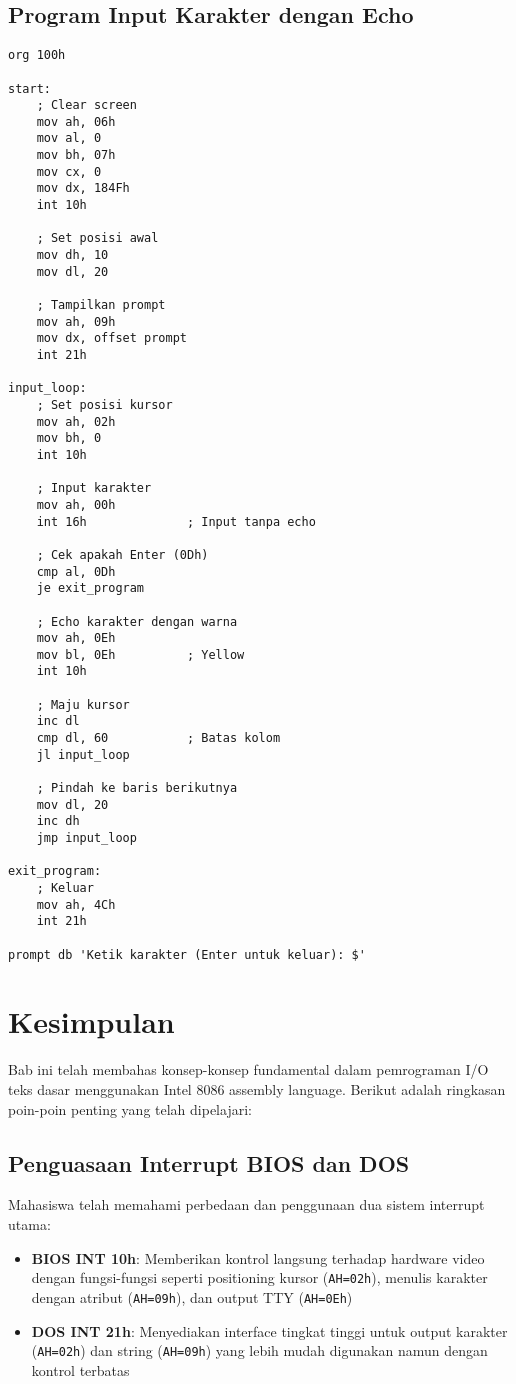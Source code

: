 \documentclass[../main.tex]{subfiles}
\begin{document}
        \subsection{Program Input Karakter dengan Echo}
            \begin{lstlisting}[language={[x86masm]Assembler}, caption=Program Input Karakter dengan Echo, label={lst:input-echo}]
org 100h

start:
    ; Clear screen
    mov ah, 06h
    mov al, 0
    mov bh, 07h
    mov cx, 0
    mov dx, 184Fh
    int 10h
    
    ; Set posisi awal
    mov dh, 10
    mov dl, 20
    
    ; Tampilkan prompt
    mov ah, 09h
    mov dx, offset prompt
    int 21h
    
input_loop:
    ; Set posisi kursor
    mov ah, 02h
    mov bh, 0
    int 10h
    
    ; Input karakter
    mov ah, 00h
    int 16h              ; Input tanpa echo
    
    ; Cek apakah Enter (0Dh)
    cmp al, 0Dh
    je exit_program
    
    ; Echo karakter dengan warna
    mov ah, 0Eh
    mov bl, 0Eh          ; Yellow
    int 10h
    
    ; Maju kursor
    inc dl
    cmp dl, 60           ; Batas kolom
    jl input_loop
    
    ; Pindah ke baris berikutnya
    mov dl, 20
    inc dh
    jmp input_loop
    
exit_program:
    ; Keluar
    mov ah, 4Ch
    int 21h

prompt db 'Ketik karakter (Enter untuk keluar): $'
            \end{lstlisting}

    \section{Kesimpulan}
        Bab ini telah membahas konsep-konsep fundamental dalam pemrograman I/O teks dasar menggunakan Intel 8086 assembly language. Berikut adalah ringkasan poin-poin penting yang telah dipelajari:

        \subsection{Penguasaan Interrupt BIOS dan DOS}
            Mahasiswa telah memahami perbedaan dan penggunaan dua sistem interrupt utama:
            \begin{itemize}
                \item \textbf{BIOS INT 10h}: Memberikan kontrol langsung terhadap hardware video dengan fungsi-fungsi seperti positioning kursor (\texttt{AH=02h}), menulis karakter dengan atribut (\texttt{AH=09h}), dan output TTY (\texttt{AH=0Eh})
                \item \textbf{DOS INT 21h}: Menyediakan interface tingkat tinggi untuk output karakter (\texttt{AH=02h}) dan string (\texttt{AH=09h}) yang lebih mudah digunakan namun dengan kontrol terbatas
            \end{itemize}
\end{document}
